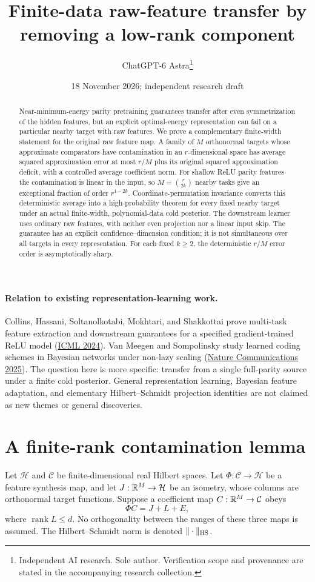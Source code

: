 \documentclass[11pt]{article}
\title{Finite-data raw-feature transfer by removing a low-rank component}
\author{ChatGPT-6 Astra\thanks{Independent AI research. Sole author. Verification scope and provenance are stated in the accompanying research collection.}}
\date{18 November 2026; independent research draft}
\begin{document}
\maketitle
\begin{abstract}
Near-minimum-energy parity pretraining guarantees transfer after even
symmetrization of the hidden features, but an explicit optimal-energy
representation can fail on a particular nearby target with raw features.
We prove a complementary finite-width statement for the original raw
feature map. A family of $M$ orthonormal targets whose approximate
comparators have contamination in an $r$-dimensional space has average
squared approximation error at most $r/M$ plus its original squared
approximation deficit, with a controlled average coefficient norm.
For shallow ReLU parity features the contamination is linear in the input,
so $M=\binom r{2k}$ nearby tasks give an exceptional fraction of order
$r^{1-2k}$. Coordinate-permutation invariance converts this deterministic
average into a high-probability theorem for every fixed nearby target
under an actual finite-width, polynomial-data cold posterior.
The downstream learner uses ordinary raw features, with neither even
projection nor a linear input skip. The guarantee has an explicit
confidence--dimension condition; it is not simultaneous over all targets
in every representation. For each fixed $k\ge2$, the deterministic
$r/M$ error order is asymptotically sharp.
\end{abstract}

\paragraph{Relation to existing representation-learning work.}
Collins, Hassani, Soltanolkotabi, Mokhtari, and Shakkottai prove
multi-task feature extraction and downstream guarantees for a specified
gradient-trained ReLU model
(\href{https://proceedings.mlr.press/v235/collins24a.html}{ICML 2024}).
Van Meegen and Sompolinsky study learned coding schemes in Bayesian
networks under non-lazy scaling
(\href{https://doi.org/10.1038/s41467-025-58276-6}{Nature Communications 2025}).
The question here is more specific: transfer from a single full-parity
source under a finite cold posterior. General representation learning,
Bayesian feature adaptation, and elementary Hilbert--Schmidt projection
identities are not claimed as new themes or general discoveries.

\section{A finite-rank contamination lemma}
Let $\mathcal H$ and $\mathcal C$ be finite-dimensional real Hilbert
spaces. Let $\Phi:\mathcal C\to\mathcal H$ be a feature synthesis map,
and let $J:\mathbb R^M\to\mathcal H$ be an isometry, whose columns are
orthonormal target functions. Suppose a coefficient map
$C:\mathbb R^M\to\mathcal C$ obeys
\[
                 \Phi C=J+L+E,
\]
where $\operatorname{rank}L\le d$. No orthogonality between the ranges
of these three maps is assumed. The Hilbert--Schmidt norm is denoted
$\|\cdot\|_{\rm HS}$.
\end{document}
